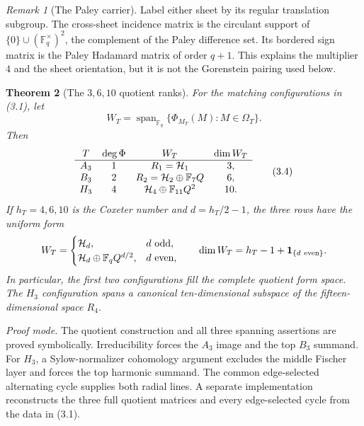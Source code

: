 \documentclass[11pt]{article}
\newtheorem{theorem}{Theorem}[section]
\theoremstyle{definition}
\theoremstyle{remark}
\newtheorem{remark}[theorem]{Remark}
\newcommand{\F}{\mathbb{F}}
\begin{document}
\begin{remark}[The Paley carrier]
\label{rem:paley-carrier}
Label either sheet by its regular translation subgroup.  The cross-sheet
incidence matrix is the circulant support of
\(\{0\}\cup(\F_q^\times)^2\), the complement of the Paley difference
set.  Its bordered sign matrix is the Paley Hadamard matrix of order
\(q+1\).  This explains the multiplier \(4\) and the sheet orientation,
but it is not the Gorenstein pairing used below.
\end{remark}

\begin{theorem}[The \(3,6,10\) quotient ranks]
\label{thm:rank-three-quotients}
For the matching configurations in (3.1), let
\[
 W_T=\operatorname{span}_{\F_q}
 \{\Phi_{M_T}(M):M\in\Omega_T\}.
\]
Then
\[
\begin{array}{c@{\quad}c@{\quad}c@{\quad}c}
T&\deg\Phi& W_T&\dim W_T\\ \hline
A_3&1&R_1=\mathcal H_1&3,\\
B_3&2&R_2=\mathcal H_2\oplus\F_7Q&6,\\
H_3&4&\mathcal H_4\oplus\F_{11}Q^2&10.
\end{array}                                               \tag{3.4}
\]
If \(h_T=4,6,10\) is the Coxeter number and
\(d=h_T/2-1\), the three rows have the uniform form
\[
 W_T=
 \begin{cases}
 \mathcal H_d,&d\ \text{odd},\\
 \mathcal H_d\oplus\F_qQ^{d/2},&d\ \text{even},
 \end{cases}
 \qquad
 \dim W_T=h_T-1+\mathbf 1_{\{d\ {\rm even}\}}.
\]
In particular, the first two configurations fill the complete quotient
form space.  The \(H_3\) configuration spans a canonical ten-dimensional
subspace of the fifteen-dimensional space \(R_4\).
\end{theorem}

\noindent\emph{Proof mode.}
The quotient construction and all three spanning assertions are proved
symbolically.  Irreducibility forces the \(A_3\) image and the top \(B_3\)
summand.  For \(H_3\), a Sylow-normalizer cohomology argument excludes the
middle Fischer layer and forces the top harmonic summand.  The common
edge-selected alternating cycle supplies both radial lines.  A separate
implementation reconstructs the three full quotient matrices and every
edge-selected cycle from the data in (3.1).
\end{document}
